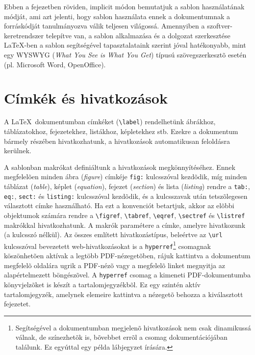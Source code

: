 Ebben a fejezetben röviden, implicit módon bemutatjuk a sablon használatának módját, ami azt jelenti, hogy sablon használata ennek a dokumentumnak a forráskódját tanulmányozva válik teljesen világossá. Amennyiben a szoftver-keretrendszer telepítve van, a sablon alkalmazása és a dolgozat szerkesztése \LaTeX-ben a sablon segítségével tapasztalataink szerint jóval hatékonyabb, mint egy WYSWYG (\emph{What You See is What You Get}) típusú szövegszerkesztõ esetén (pl. Microsoft Word, OpenOffice).

\section{Címkék és hivatkozások}
A \LaTeX~dokumentumban címkéket (\verb+\label+) rendelhetünk ábrákhoz, táblázatokhoz, fejezetekhez, listákhoz, képletekhez stb. Ezekre a dokumentum bármely részében hivatkozhatunk, a hivatkozások automatikusan feloldásra kerülnek.

A sablonban makrókat definiáltunk a hivatkozások megkönnyítéséhez. Ennek megfelelõen minden ábra (\emph{figure}) címkéje \verb+fig:+ kulcsszóval kezdõdik, míg minden táblázat (\emph{table}), képlet (\emph{equation}), fejezet (\emph{section}) és lista (\emph{listing}) rendre a \verb+tab:+, \verb+eq:+, \verb+sect:+ és \verb+listing:+ kulcsszóval kezdõdik, és a kulcsszavak után tetszõlegesen választott címke használható. Ha ezt a konvenciót betartjuk, akkor az elõbbi objektumok számára rendre a \verb+\figref+, \verb+\tabref+, \verb+\eqref+, \verb+\sectref+ és \verb+\listref+ makrókkal hivatkozhatunk. A makrók paramétere a címke, amelyre hivatkozunk (a kulcsszó nélkül). Az összes említett hivatkozástípus, beleértve az \verb+\url+ kulcsszóval bevezetett web-hivatkozásokat is a  \verb+hyperref+\footnote{Segítségével a dokumentumban megjelenõ hivatkozások nem csak dinamikussá válnak, de színezhetõk is, bõvebbet errõl a csomag dokumentációjában találunk. Ez egyúttal egy példa lábjegyzet írására.} csomagnak köszönhetõen aktívak a legtöbb PDF-nézegetõben, rájuk kattintva a dokumentum megfelelõ oldalára ugrik a PDF-nézõ vagy a megfelelõ linket megnyitja az alapértelmezett böngészõvel. A \verb+hyperref+ csomag a kimeneti PDF-dokumentumba könyvjelzõket is készít a tartalomjegyzékbõl. Ez egy szintén aktív tartalomjegyzék, amelynek elemeire kattintva a nézegetõ behozza a kiválasztott fejezetet.

